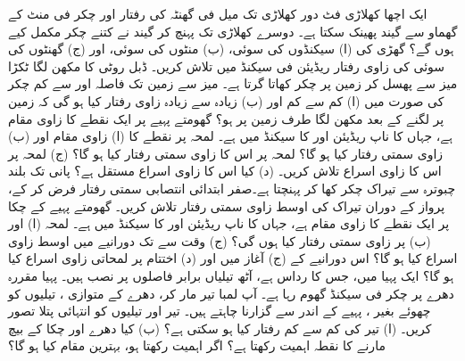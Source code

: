 \setcounter{questioncounter}{0}
ایک اچھا کھلاڑی  فٹ دور  کھلاڑی تک   میل فی گھنٹہ کی رفتار   اور  چکر فی منٹ  کے گھماو سے  گیند  پھینک سکتا ہے۔ دوسرے کھلاڑی تک پہنچ کر گیند نے کتنے چکر مکمل کیے ہوں گے؟
گھڑی کی (ا) سیکنڈوں کی سوئی، (ب) منٹوں کی سوئی، اور (ج) گھنٹوں کی سوئی  کی زاوی رفتار  ریڈیئن فی سیکنڈ میں تلاش کریں۔
  ڈبل روٹی  کا  مکھن لگا ٹکڑا میز  سے پھسل کر زمین پر چکر کھاتا  گرتا ہے۔ میز سے زمین تک فاصلہ  اور    سے  کم چکر کی صورت میں (ا) کم سے کم اور (ب) زیادہ سے زیادہ   زاوی رفتار  کیا ہو گی کہ زمین پر  لگنے کے بعد   مکھن    لگا  طرف زمین پر  ہو؟
گھومتے پہیے پر ایک نقطے کا زاوی مقام  ہے، جہاں  کا  ناپ ریڈیئن اور   کا  سیکنڈ میں ہے۔ لمحہ  پر  نقطے کا (ا)  زاوی مقام   اور  (ب) زاوی سمتی رفتار  کیا ہو گا؟ لمحہ  پر  اس کا زاوی سمتی رفتار کیا ہو گا؟ (ج) لمحہ  پر اس کا زاوی اسراع تلاش کریں۔ (د) کیا اس کا زاوی اسراع مستقل ہے؟
 پانی تک  بلند چبوترہ سے  تیراک  چکر کھا  کر  پہنچتا ہے۔صفر ابتدائی انتصابی سمتی رفتار فرض کر کے،   پرواز کے دوران  تیراک کی اوسط زاوی سمتی رفتار تلاش کریں۔
گھومتے پہیے کے چکا  پر  ایک نقطے کا زاوی مقام  ہے، جہاں  کا ناپ ریڈیئن اور   کا سیکنڈ میں ہے۔  لمحہ  (ا)  اور (ب)     پر  زاوی سمتی رفتار کیا ہوں گی؟  (ج)  وقت   سے   تک دورانیے میں  اوسط زاوی اسراع کیا ہو گا؟ اس دورانیے کے (ج) آغاز میں اور (د) اختتام پر لمحاتی زاوی اسراع کیا ہو گا؟
ایک پہیا میں،  جس کا  رداس  ہے،   آٹھ  تیلیاں  برابر فاصلوں پر نصب ہیں۔ پہیا مقررہ دھرے پر  چکر فی سیکنڈ گھوم رہا ہے۔ آپ  لمبا تیر   مار کر، دھرے  کے متوازی  ، تیلیوں کو چھوئے بغیر ،  پہیے کے اندر  سے  گزارنا چاہتے ہیں۔ تیر اور تیلیوں کو انتہائی پتلا تصور کریں۔ (ا) تیر کی کم سے کم رفتار کیا ہو سکتی ہے؟ (ب) کیا دھرے اور چکا کے بیچ  مارنے کا نقطہ اہمیت رکھتا ہے؟ اگر اہمیت رکھتا ہو، بہترین مقام کیا ہو گا؟
